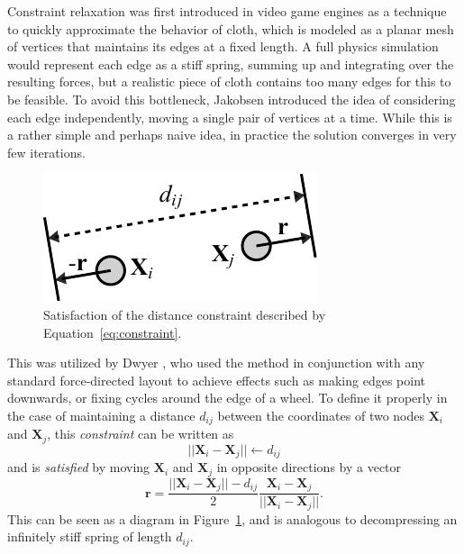 Constraint relaxation was first introduced in video game engines as a technique to quickly approximate the behavior of cloth, which is modeled as a planar mesh of vertices that maintains its edges at a fixed length.
A full physics simulation would represent each edge as a stiff spring, summing up and integrating over the resulting forces, but a realistic piece of cloth contains too many edges for this to be feasible.
To avoid this bottleneck, Jakobsen \cite{Jakobsen2001} introduced the idea of considering each edge independently, moving a single pair of vertices at a time.
While this is a rather simple and perhaps naive idea, in practice the solution converges in very few iterations.

\begin{figure}
  \centering
  \includegraphics[width=.5\textwidth]{stress/satisfaction.pdf}
  \caption[Illustration of the distance constraint in Equation~\ref{eq:constraint}]{Satisfaction of the distance constraint described by Equation~\eqref{eq:constraint}.}
  \label{fig:satisfaction}
\end{figure}

This was utilized by Dwyer \cite{Dwyer2009}, who used the method in conjunction with any standard force-directed layout to achieve effects such as making edges point downwards, or fixing cycles around the edge of a wheel. To define it properly in the case of maintaining a distance $d_{ij}$ between the coordinates of two nodes $\mathbf{X}_i$ and $\mathbf{X}_j$, this \emph{constraint} can be written as
\begin{equation}
  ||\mathbf{X}_i - \mathbf{X}_j|| \leftarrow d_{ij}
  \label{eq:constraint}
\end{equation}
and is \emph{satisfied} by moving $\mathbf{X}_i$ and $\mathbf{X}_j$ in opposite directions by a vector
\begin{equation}
  \mathbf{r} = \frac{||\mathbf{X}_i - \mathbf{X}_j||-d_{ij}}{2}\frac{\mathbf{X}_i - \mathbf{X}_j}{||\mathbf{X}_i - \mathbf{X}_j||}.
  \label{eq:satisfaction}
\end{equation}
This can be seen as a diagram in Figure~\ref{fig:satisfaction}, and is analogous to decompressing an infinitely stiff spring of length $d_{ij}$.


